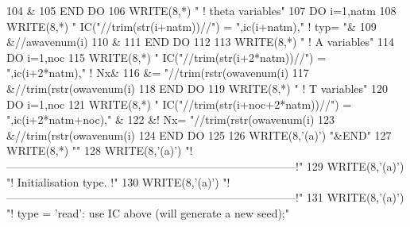 \begin{DoxyCode}
104             &%
105 \textcolor{keywordflow}{    END DO}
106     \textcolor{keyword}{WRITE}(8,*) \textcolor{stringliteral}{" ! theta variables"}
107     \textcolor{keywordflow}{DO} i=1,natm
108        \textcolor{keyword}{WRITE}(8,*) \textcolor{stringliteral}{" IC("}//trim(str(i+natm))//\textcolor{stringliteral}{") = "},ic(i+natm),\textcolor{stringliteral}{"   ! typ= "}&
109             &//awavenum(i)%
110             &%
111 \textcolor{keywordflow}{    END DO}
112 
113     \textcolor{keyword}{WRITE}(8,*) \textcolor{stringliteral}{" ! A variables"}
114     \textcolor{keywordflow}{DO} i=1,noc
115        \textcolor{keyword}{WRITE}(8,*) \textcolor{stringliteral}{" IC("}//trim(str(i+2*natm))//\textcolor{stringliteral}{") = "},ic(i+2*natm),\textcolor{stringliteral}{"   ! Nx&}
116 \textcolor{stringliteral}{}\textcolor{stringliteral}{            &= "}//trim(rstr(owavenum(i)%
117             &//trim(rstr(owavenum(i)%
118 \textcolor{keywordflow}{    END DO}
119     \textcolor{keyword}{WRITE}(8,*) \textcolor{stringliteral}{" ! T variables"}
120     \textcolor{keywordflow}{DO} i=1,noc
121        \textcolor{keyword}{WRITE}(8,*) \textcolor{stringliteral}{" IC("}//trim(str(i+noc+2*natm))//\textcolor{stringliteral}{") = "},ic(i+2*natm+noc),\textcolor{stringliteral}{"   &}
122 \textcolor{stringliteral}{}\textcolor{stringliteral}{            &! Nx= "}//trim(rstr(owavenum(i)%
123             &//trim(rstr(owavenum(i)%
124 \textcolor{keywordflow}{    END DO}
125 
126     \textcolor{keyword}{WRITE}(8,\textcolor{stringliteral}{'(a)'}) \textcolor{stringliteral}{"&END"}
127     \textcolor{keyword}{WRITE}(8,*) \textcolor{stringliteral}{""}
128     \textcolor{keyword}{WRITE}(8,\textcolor{stringliteral}{'(a)'}) \textcolor{stringliteral}{"!------------------------------------------------------------------------------!"}
129     \textcolor{keyword}{WRITE}(8,\textcolor{stringliteral}{'(a)'}) \textcolor{stringliteral}{"! Initialisation type.                                                         !"}
130     \textcolor{keyword}{WRITE}(8,\textcolor{stringliteral}{'(a)'}) \textcolor{stringliteral}{"!------------------------------------------------------------------------------!"}
131     \textcolor{keyword}{WRITE}(8,\textcolor{stringliteral}{'(a)'}) \textcolor{stringliteral}{"! type = 'read': use IC above (will generate a new seed);"}

\end{DoxyCode}
